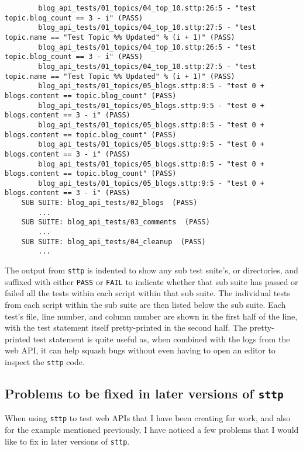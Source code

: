\begin{verbatim}
        blog_api_tests/01_topics/04_top_10.sttp:26:5 - "test topic.blog_count == 3 - i" (PASS)
        blog_api_tests/01_topics/04_top_10.sttp:27:5 - "test topic.name == "Test Topic %% Updated" % (i + 1)" (PASS)
        blog_api_tests/01_topics/04_top_10.sttp:26:5 - "test topic.blog_count == 3 - i" (PASS)
        blog_api_tests/01_topics/04_top_10.sttp:27:5 - "test topic.name == "Test Topic %% Updated" % (i + 1)" (PASS)
        blog_api_tests/01_topics/05_blogs.sttp:8:5 - "test 0 + blogs.content == topic.blog_count" (PASS)
        blog_api_tests/01_topics/05_blogs.sttp:9:5 - "test 0 + blogs.content == 3 - i" (PASS)
        blog_api_tests/01_topics/05_blogs.sttp:8:5 - "test 0 + blogs.content == topic.blog_count" (PASS)
        blog_api_tests/01_topics/05_blogs.sttp:9:5 - "test 0 + blogs.content == 3 - i" (PASS)
        blog_api_tests/01_topics/05_blogs.sttp:8:5 - "test 0 + blogs.content == topic.blog_count" (PASS)
        blog_api_tests/01_topics/05_blogs.sttp:9:5 - "test 0 + blogs.content == 3 - i" (PASS)
    SUB SUITE: blog_api_tests/02_blogs  (PASS)
        ...
    SUB SUITE: blog_api_tests/03_comments  (PASS)
        ...
    SUB SUITE: blog_api_tests/04_cleanup  (PASS)
        ...
\end{verbatim}

The output from \verb|sttp| is indented to show any sub test suite's, or directories, and suffixed with either \verb|PASS| or \verb|FAIL| to indicate whether that sub suite has passed or failed all the tests within each script within that sub suite. The individual tests from each script within the sub suite are then listed below the sub suite. Each test's file, line number, and column number are shown in the first half of the line, with the test statement itself pretty-printed in the second half. The pretty-printed test statement is quite useful as, when combined with the logs from the web API, it can help squash bugs without even having to open an editor to inspect the \verb|sttp| code.

\cprotect\subsection{Problems to be fixed in later versions of \verb|sttp|}
\label{sec:hello-sttp-problems-to-be-fixed}

When using \verb|sttp| to test web APIs that I have been creating for work, and also for the example mentioned previously, I have noticed a few problems that I would like to fix in later versions of \verb|sttp|.

